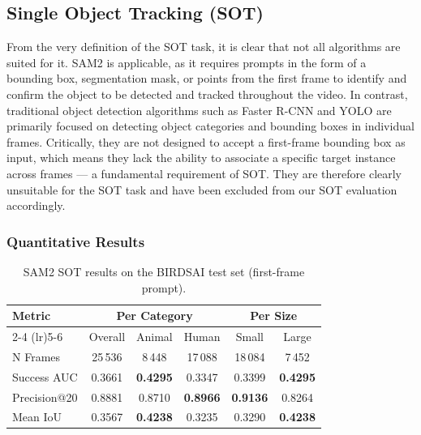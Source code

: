 \documentclass[
]{article}
\begin{document}
\hypertarget{Single Object Tracking (SOT)}{%
\subsection{Single Object Tracking (SOT)}\label{SOT}}

From the very definition of the SOT task, it is clear that not all algorithms are suited for it. 
SAM2 is applicable, as it requires prompts in the form of a bounding box, segmentation mask, or points from the first frame to identify and confirm the object to be detected and tracked throughout the video. 
In contrast, traditional object detection algorithms such as Faster R-CNN and YOLO are primarily focused on detecting object categories and bounding boxes in individual frames. 
Critically, they are not designed to accept a first-frame bounding box as input, which means they lack the ability to associate a specific target instance across frames — a fundamental requirement of SOT. 
They are therefore clearly unsuitable for the SOT task and have been excluded from our SOT evaluation accordingly.

\hypertarget{Quantitative Results}{%
\subsubsection{Quantitative Results}\label{SOT_Quantitative}}

\begin{table}[htbp]
\centering
\begin{tabular}{l ccc cc}
\toprule
\textbf{Metric} & \multicolumn{3}{c}{\textbf{Per Category}} & \multicolumn{2}{c}{\textbf{Per Size}} \\
\cmidrule(lr){2-4} \cmidrule(lr){5-6}
 & Overall & Animal & Human & Small & Large \\
\midrule
N Frames      & 25\,536 & 8\,448  & 17\,088 & 18\,084 & 7\,452  \\
Success AUC   & 0.3661  & \textbf{0.4295} & 0.3347  & 0.3399  & \textbf{0.4295} \\
Precision@20  & 0.8881  & 0.8710  & \textbf{0.8966} & \textbf{0.9136} & 0.8264 \\
Mean IoU      & 0.3567  & \textbf{0.4238} & 0.3235  & 0.3290  & \textbf{0.4238} \\
\bottomrule
\end{tabular}
\caption{SAM2 SOT results on the BIRDSAI test set (first-frame prompt).}
\label{tab:sot-birdsai}
\end{table}
\end{document}
